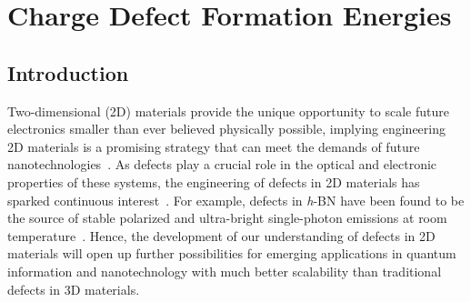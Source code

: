 \def\cbns{C$_\text{B}$}
\def\cb{C$_\text{B}$ }
\def\vncbns{V$_\text{N}$C$_\text{B}$}
\def\vncb{V$_\text{N}$C$_\text{B}$ }
\def\vnns{C$_\text{N}$}
\def\cn{C$_\text{N}$ }
\def\gwns{$G_0W_0$}
\def\gw{$G_0W_0$ }
\def\gns{$\Gamma$}
\def\g{$\Gamma$ }
\def\bR{\mathbf{R}}
\def\veps{\varepsilon}
\def\pans{PBE0($\alpha$)}
\def\p0a{PBE0($\alpha$)\text{}}

\section{Charge Defect Formation Energies}

\subsection{Introduction}
Two-dimensional (2D) materials provide the unique opportunity to scale future electronics smaller than ever believed physically possible, implying engineering 2D materials is a promising strategy that can meet the demands of future nanotechnologies~\cite{butler2013progress}.
As defects play a crucial role in the optical and electronic properties of these systems, the engineering of defects in 2D materials has sparked continuous interest~\cite{wang2017engineering,hong2017atomic,lin2016defect,dreyer2018first,weston2018native,tawfik2017first}. For example, defects in \textit{h}-BN have been found to be the source of stable polarized and ultra-bright single-photon emissions at room temperature~\cite{bourrellier2016bright,abdi2018color,aharonovich2017quantum,tran2016quantum}. Hence, the development of our understanding of defects in 2D materials will open up further possibilities for emerging applications in quantum information and nanotechnology with much better scalability than traditional defects in 3D materials.

